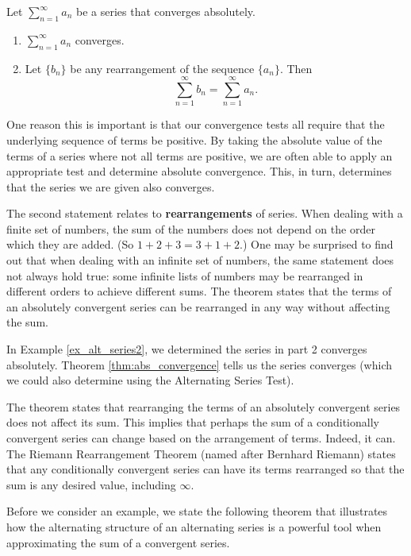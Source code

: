 \documentclass[10pt]{article}
\newcommand{\ds}{\displaystyle}
\newcommand{\sword}[1]{\textbf{#1}}
\begin{document}
{Let $\ds \sum_{n=1}^\infty a_n$ be a series that converges absolutely.
\begin{enumerate}
	\item $\ds \sum_{n=1}^\infty a_n$ converges.
	
	\item	Let $\{b_n\}$ be any rearrangement of the sequence $\{a_n\}$. Then 
	$$ \sum_{n=1}^\infty b_n = \sum_{n=1}^\infty a_n.$$
\end{enumerate}
}

One reason this is important is that our convergence tests all require that the underlying sequence of terms be positive. By taking the absolute value of the terms of a series where not all terms are positive, we are often able to apply an appropriate test and determine absolute convergence. This, in turn, determines that the series we are given also converges.

The second statement relates to \sword{rearrangements} of series. When dealing with a finite set of numbers, the sum of the numbers does not depend on the order which they are added. (So $1+2+3 = 3+1+2$.) One may be surprised to find out that when dealing with an infinite set of numbers, the same statement does not always hold true: some infinite lists of numbers may be rearranged in different orders to achieve different sums. The theorem states that the terms of an absolutely convergent series can be rearranged in any way without affecting the sum.

In Example \ref{ex_alt_series2}, we determined the series in part 2 converges absolutely. Theorem \ref{thm:abs_convergence} tells us the series converges (which we could also determine using the Alternating Series Test).

The theorem states that rearranging the terms of an absolutely convergent series does not affect its sum. This implies that perhaps the sum of a conditionally convergent series can change based on the arrangement of terms. Indeed, it can. The Riemann Rearrangement Theorem (named after Bernhard Riemann) states that any conditionally convergent series can have its terms rearranged so that the sum is any desired value, including $\infty$.

Before we consider an example, we state the following theorem that illustrates how the alternating structure of an alternating series is a powerful tool when approximating the sum of a convergent series.
\end{document}
